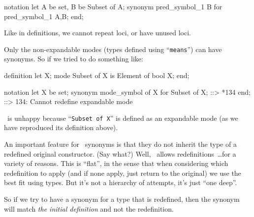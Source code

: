 \begin{node}
\begin{node}
\begin{mizar}
notation
  let A be set, B be Subset of A;
  synonym pred_symbol_1 B for pred_symbol_1 A,B;
end;
\end{mizar}
\end{node}

\begin{node}\label{mizar-001L}%
Like in definitions, we cannot repeat loci, or have unused loci.
\end{node}

\begin{node}\label{mizar-001M}%
Only the non-expandable modes (types defined using ``\texttt{means}'')
can have synonyms. So if we tried to do something like:
\begin{mizar}
definition
  let X;
  mode Subset of X is Element of bool X;
end;

notation
  let X be set;
  synonym mode_symbol of X for Subset of X;
::>                                 *134
end;
::> 134: Cannot redefine expandable mode
\end{mizar}
\Mizar\ is unhappy because ``\texttt{Subset of X}'' is defined as an
expandable mode (as we have reproduced its definition above).
\end{node}

\begin{node}\label{mizar-001N}%
An important feature for \Mizar\ synonyms is that they do not inherit
the type of a redefined original constructor. (Say what?) Well,
\Mizar\ allows redefinitions~\dots for a variety of reasons. This is
``flat'', in the sense that when considering which redefinition to apply
(and if none apply, just return to the original) we use the best fit
using types. But it's not a hierarchy of attempts, it's just ``one deep''.

So if we try to have a synonym for a type that is redefined, then the
synonym will match \emph{the initial definition} and not the redefinition.
\end{node}
\end{node}

